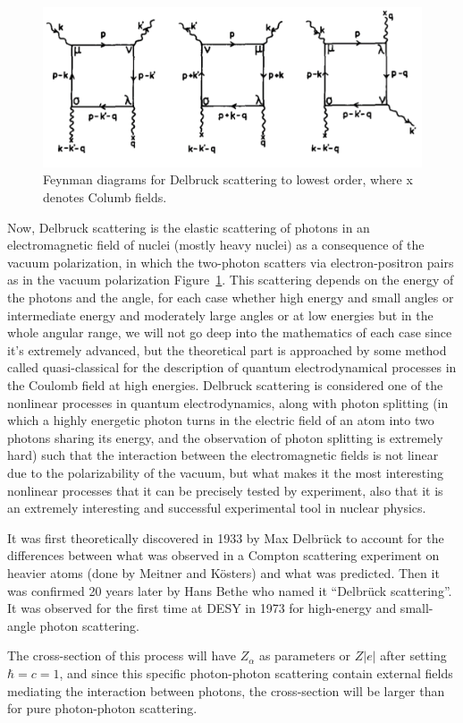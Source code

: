 \documentclass{paper}
\begin{document}
\begin{figure}[!th]
	\centering
	\includegraphics[width=0.5\linewidth]{figures/fyenman-diagram-Delbruck.png}
	\caption{Feynman diagrams for Delbruck scattering to lowest order, where x denotes Columb fields.}
	\label{fig:Feynman-Delbruck}
\end{figure}
Now, Delbruck scattering is the elastic scattering of photons in an electromagnetic field of nuclei (mostly heavy nuclei) as a consequence of the vacuum polarization, in which the two-photon scatters via electron-positron pairs as in the vacuum polarization Figure~\ref{fig:Feynman-Delbruck}.
This scattering depends on the energy of the photons and the angle, for each case whether high energy and small angles or intermediate energy and moderately large angles or at low energies but in the whole angular range, we will not go deep into the mathematics of each case since it’s extremely advanced, but the theoretical part is approached by some method called quasi-classical for the description of quantum electrodynamical processes in the Coulomb field at high energies.
Delbruck scattering is considered one of the nonlinear processes in quantum electrodynamics, along with photon splitting (in which a highly energetic photon turns in the electric field of an atom into two photons sharing its energy, and the observation of photon splitting is extremely hard) such that the interaction between the electromagnetic fields is not linear due to the polarizability of the vacuum, but what makes it the most interesting nonlinear processes that it can be precisely tested by experiment, also that it is an extremely interesting and successful experimental tool in nuclear physics.

It was first theoretically discovered in 1933 by Max Delbrück to account for the differences between what was observed in a Compton scattering experiment on heavier atoms (done by Meitner and Kösters) and what was predicted. Then it was confirmed 20 years later by Hans Bethe who named it “Delbrück scattering”. It was observed for the first time at DESY in 1973 for high-energy and small-angle photon scattering.

The cross-section of this process will have $Z_\alpha$ as parameters or $Z|e|$ after setting $\hbar=c=1$, and since this specific photon-photon scattering contain external fields mediating the interaction between photons, the cross-section will be larger than for pure photon-photon scattering.
\end{document}
